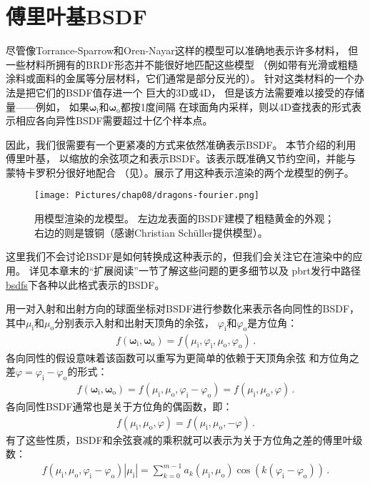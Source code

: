 \section{傅里叶基BSDF}\label{sec:傅里叶基BSDF}
尽管像Torrance-Sparrow和Oren-Nayar这样的模型可以准确地表示许多材料，
但一些材料所拥有的BRDF形态并不能很好地匹配这些模型
（例如带有光滑或粗糙涂料或面料的金属等分层材料，它们通常是部分反光的）。
针对这类材料的一个办法是把它们的BSDF值存进一个
巨大的3D或4D，
但是该方法需要难以接受的存储量——例如，
如果${\bm\omega}_{\mathrm{i}}$和${\bm\omega}_{\mathrm{o}}$都按1度间隔
在球面角内采样，则以4D查找表的形式表示相应各向异性BSDF需要超过十亿个样本点。

因此，我们很需要有一个更紧凑的方式来依然准确表示BSDF。
本节介绍的利用傅里叶基，
以缩放的余弦项之和表示BSDF。该表示既准确又节约空间，并能与蒙特卡罗积分很好地配合
（见）。展示了用这种表示渲染的两个龙模型的例子。
\begin{figure}[htbp]
    \centering
    \texttt{[image: Pictures/chap08/dragons-fourier.png]}
    \caption{用模型渲染的龙模型。
        左边龙表面的BSDF建模了粗糙黄金的外观；右边的则是镀铜（感谢Christian Schüller提供模型）。}
    \label{fig:8.24}
\end{figure}

这里我们不会讨论BSDF是如何转换成这种表示的，但我们会关注它在渲染中的应用。
详见本章末的“扩展阅读”一节了解这些问题的更多细节以及
pbrt发行中路径\href{https://pbrt.org/scenes-v3}{\ttfamily bsdfs}下各种以此格式表示的BSDF。

用一对入射和出射方向的球面坐标对BSDF进行参数化来表示各向同性的BSDF，
其中$\mu_{\mathrm{i}}$和$\mu_{\mathrm{o}}$分别表示入射和出射天顶角的余弦，
$\varphi_{\mathrm{i}}$和$\varphi_{\mathrm{o}}$是方位角：
\begin{align*}
    f({\bm\omega}_{\mathrm{i}},{\bm\omega}_{\mathrm{o}})
    =f(\mu_{\mathrm{i}},\varphi_{\mathrm{i}},\mu_{\mathrm{o}},\varphi_{\mathrm{o}})\, .
\end{align*}
各向同性的假设意味着该函数可以重写为更简单的依赖于天顶角余弦
和方位角之差$\varphi=\varphi_{\mathrm{i}}-\varphi_{\mathrm{o}}$的形式：
\begin{align*}
    f({\bm\omega}_{\mathrm{i}},{\bm\omega}_{\mathrm{o}})
    =f(\mu_{\mathrm{i}},\mu_{\mathrm{o}},\varphi_{\mathrm{i}}-\varphi_{\mathrm{o}})
    =f(\mu_{\mathrm{i}},\mu_{\mathrm{o}},\varphi)\, .
\end{align*}
各向同性BSDF通常也是关于方位角的偶函数，即：
\begin{align}\label{eq:8.20}
    f(\mu_{\mathrm{i}},\mu_{\mathrm{o}},\varphi)=f(\mu_{\mathrm{i}},\mu_{\mathrm{o}},-\varphi)\, .
\end{align}
有了这些性质，BSDF和余弦衰减的乘积就可以表示为关于方位角之差的傅里叶级数：
\begin{align}\label{eq:8.21}
    f(\mu_{\mathrm{i}},\mu_{\mathrm{o}},\varphi_{\mathrm{i}}-\varphi_{\mathrm{o}})|\mu_{\mathrm{i}}|
    =\sum\limits_{k=0}^{m-1}a_k(\mu_{\mathrm{i}},\mu_{\mathrm{o}})\cos(k(\varphi_{\mathrm{i}}-\varphi_{\mathrm{o}}))\, .
\end{align}


